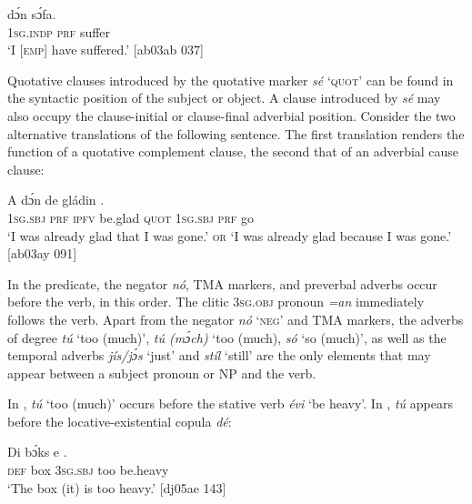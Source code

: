 \ea%
    \label{ex:key:519}
    \gll {}    dɔ́n  sɔ́fa.\\
\textsc{1sg.indp}  \textsc{prf}  suffer\\

\glt ‘I [\textsc{emp}] have suffered.’ [ab03ab 037]
\z

Quotative clauses introduced by the quotative marker \textit{sé} ‘\textsc{quot}’ can be found in the syntactic position of the subject or object. A clause introduced by \textit{sé} may also occupy the clause-initial or clause-final adverbial position. Consider the two alternative translations of the following sentence. The first translation renders the function of a quotative complement clause, the second that of an adverbial cause clause: 


\ea%
    \label{ex:key:520}
    \gll A    dɔ́n  de  gládin  .\\
\textsc{1sg.sbj}  \textsc{prf}  \textsc{ipfv}  be.glad  \textsc{quot}    \textsc{1sg.sbj}  \textsc{prf}  go\\

\glt ‘I was already glad that I was gone.’ \textsc{or} 
‘I was already glad because I was gone.’ [ab03ay 091]
\z

In the predicate, the negator \textit{nó}, \textsc{TMA} markers, and preverbal adverbs occur before the verb, in this order. The clitic \textsc{3sg.obj} pronoun \textit{=an} immediately follows the verb. Apart from the negator \textit{nó} ‘\textsc{neg}’ and \textsc{TMA} markers, the adverbs of degree \textit{tú} ‘too (much)’, \textit{tú (mɔ́ch)} ‘too (much), \textit{só} ‘so (much)’, as well as the temporal adverbs\textit{ jís}\textit{\textup{/}}\textit{jɔ́s} ‘just’ and \textit{stíl} ‘still’ are the only elements that may appear between a subject pronoun or NP and the verb. 


In , \textit{tú} ‘too (much)’ occurs before the stative verb \textit{évi} ‘be heavy’. In , \textit{tú} appears before the locative-existential copula \textit{dé}: 



\ea%
    \label{ex:key:521}
    \gll Di  bɔ́ks    e      .\\
\textsc{def}  box    \textsc{3sg.sbj}  too  be.heavy\\

\glt ‘The box (it) is too heavy.’ [dj05ae 143]
\z


